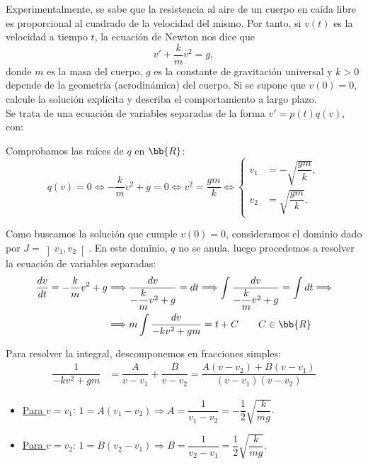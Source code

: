 \begin{ejercicio}
    Experimentalmente, se sabe que la resistencia al aire de un cuerpo en caída libre es proporcional al cuadrado de la velocidad del mismo. Por tanto, si $v(t)$ es la velocidad a tiempo $t$, la ecuación de Newton nos dice que
    \begin{equation*}
        v' + \dfrac{k}{m}v^2 = g,
    \end{equation*}
    donde $m$ es la masa del cuerpo, $g$ es la constante de gravitación universal y $k > 0$ depende de la geometría (aerodinámica) del cuerpo. Si se supone que $v(0) = 0$, calcule la solución explícita y describa el comportamiento a largo plazo.\\

    Se trata de una ecuación de variables separadas de la forma $v' = p(t)q(v)$, con:

    Comprobamos las raíces de $q$ en $\bb{R}$:
    \begin{equation*}
        q(v) = 0 \Longleftrightarrow -\dfrac{k}{m}v^2 + g = 0 \Longleftrightarrow v^2 = \dfrac{gm}{k} \Longleftrightarrow \left\{
            \begin{aligned}
                v_1 &= -\sqrt{\dfrac{gm}{k}},\\
                v_2 &= \sqrt{\dfrac{gm}{k}}.
            \end{aligned}
        \right.
    \end{equation*}

    Como buscamos la solución que cumple $v(0)=0$, consideramos el dominio dado por $J=\left]v_1,v_2\right[$. En este dominio, $q$ no se anula, luego procedemos a resolver la ecuación de variables separadas:
    \begin{align*}
        \dfrac{dv}{dt} = -\dfrac{k}{m}v^2 + g &\Longrightarrow \dfrac{dv}{-\dfrac{k}{m}v^2 + g} = dt \Longrightarrow \int \dfrac{dv}{-\dfrac{k}{m}v^2 + g} = \int dt
        \Longrightarrow \\ &\Longrightarrow m\int \dfrac{dv}{-kv^2 + gm} = t + C \qquad C\in \bb{R}
    \end{align*}

    Para resolver la integral, descomponemos en fracciones simples:
    \begin{align*}
        \dfrac{1}{-kv^2 + gm} &= \dfrac{A}{v-v_1} + \dfrac{B}{v-v_2} = \dfrac{A(v-v_2) + B(v-v_1)}{(v-v_1)(v-v_2)}
    \end{align*}
    \begin{itemize}
        \item \ul{Para $v=v_1$}: $1=A(v_1-v_2) \Longrightarrow A=\dfrac{1}{v_1-v_2}=-\dfrac{1}{2}\sqrt{\dfrac{k}{mg}}$.
        \item \ul{Para $v=v_2$}: $1=B(v_2-v_1) \Longrightarrow B=\dfrac{1}{v_2-v_1}=\dfrac{1}{2}\sqrt{\dfrac{k}{mg}}$.
    \end{itemize}


\end{ejercicio}
